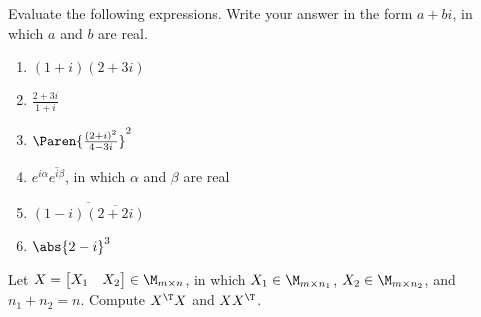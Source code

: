 \documentclass{homework}
\begin{document}
\begin{problem}[P.A.2]
  Evaluate the following expressions.  Write your answer in
  the form \(a+bi\), in which \(a\) and \(b\) are real.
  \begin{enumerate}
  \item \((1+i)(2+3i)\)

    \begin{solution}
    \end{solution}

  \item \(\frac{2+3i}{1+i}\)

    \begin{solution}
    \end{solution}

  \item \(\Paren{\frac{(2+i)^2}{4-3i}}^2\)

    \begin{solution}
    \end{solution}

  \item \(e^{i\alpha} \overline{e^{i\beta}}\), in which \(\alpha\) and
    \(\beta\) are real

    \begin{solution}
    \end{solution}

  \item \(\overline{(1-i) \overline{(2+2i)}}\)

    \begin{solution}
    \end{solution}

  \item \(\abs{2-i}^3\)

    \begin{solution}
    \end{solution}

  \end{enumerate}
\end{problem}

\begin{problem}[P.3.3]
  Let \(X = \begin{bmatrix}X_1&X_2\end{bmatrix} \in \M_{m\times n}\),
  in which \(X_1 \in \M_{m\times n_1}\), \(X_2 \in \M_{m\times n_2}\),
  and \(n_1 + n_2 = n\).  Compute \(X^\T X\) and \(X X^\T\).

  \begin{solution}
  \end{solution}

\end{problem}
\end{document}
